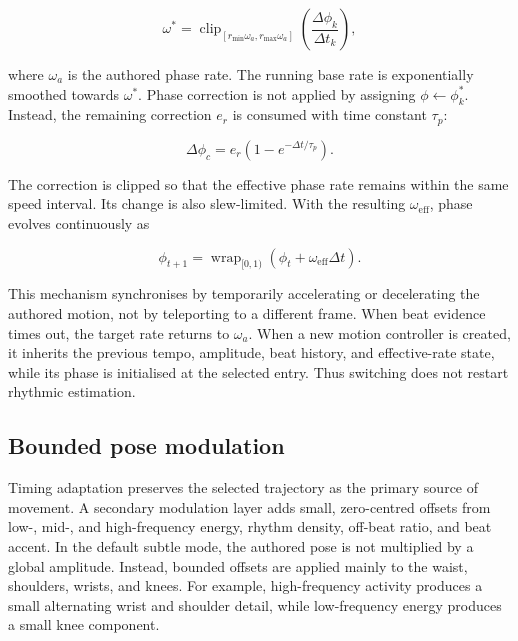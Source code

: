 \begin{equation}
    \omega^{*}=
    \operatorname{clip}_{[r_{\min}\omega_a,r_{\max}\omega_a]}
    \left(\frac{\Delta\phi_k}{\Delta t_k}\right),
    \label{eq:ch5_target_phase_rate}
\end{equation}

where $\omega_a$ is the authored phase rate. The running base rate is
exponentially smoothed towards $\omega^{*}$. Phase correction is not applied by
assigning $\phi\leftarrow\phi_k^{*}$. Instead, the remaining correction $e_r$
is consumed with time constant $\tau_p$:

\begin{equation}
    \Delta\phi_c=e_r\left(1-e^{-\Delta t/\tau_p}\right).
    \label{eq:ch5_desired_phase_correction}
\end{equation}

The correction is clipped so that the effective phase rate remains within the
same speed interval. Its change is also slew-limited. With the resulting
$\omega_{\mathrm{eff}}$, phase evolves continuously as

\begin{equation}
    \phi_{t+1}=\operatorname{wrap}_{[0,1)}
       \left(\phi_t+\omega_{\mathrm{eff}}\Delta t\right).
    \label{eq:ch5_phase_update}
\end{equation}

This mechanism synchronises by temporarily accelerating or decelerating the
authored motion, not by teleporting to a different frame. When beat evidence
times out, the target rate returns to $\omega_a$. When a new motion controller
is created, it inherits the previous tempo, amplitude, beat history, and
effective-rate state, while its phase is initialised at the selected entry.
Thus switching does not restart rhythmic estimation.

\subsection{Bounded pose modulation}
\label{subsec:ch5_pose_modulation}

Timing adaptation preserves the selected trajectory as the primary source of
movement. A secondary modulation layer adds small, zero-centred offsets from
low-, mid-, and high-frequency energy, rhythm density, off-beat ratio, and beat
accent. In the default subtle mode, the authored pose is not multiplied by a
global amplitude. Instead, bounded offsets are applied mainly to the waist,
shoulders, wrists, and knees. For example, high-frequency activity produces a
small alternating wrist and shoulder detail, while low-frequency energy
produces a small knee component.

